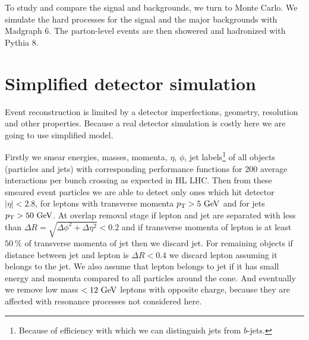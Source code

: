 \documentclass[tightenline,notitlepage,nofootinbib]{revtex4-1}
\begin{document}
To study and compare the signal and backgrounds, we turn to Monte Carlo. We simulate the hard processes for the signal and the major backgrounds with Madgraph 6. The parton-level events are then showered and hadronized with Pythia 8. 

\section{Simplified detector simulation}

Event reconstruction is limited by a detector imperfections, geometry, resolution and other properties. Because a real detector simulation is costly here we are going to use simplified model.

Firstly we smear energies, masses, momenta, $\eta$, $\phi$, jet labels\footnote{Because of efficiency with which we can distinguish jets from $b$-jets.} of all objects (particles and jets) with corresponding performance functions for $200$ average interactions per bunch crossing as expected in HL LHC. Then from these smeared event particles we are able to detect only ones which hit detector $|\eta|<2.8$, for leptons with transverse momenta $p_{\rm{T}} > 5~\rm{GeV} $ and for jets $p_{\rm T}>50~\rm{GeV}$. At overlap removal stage if lepton and jet are separated with less than $\Delta R = \sqrt{\Delta \phi^2 + \Delta \eta^2}<0.2$ and if transverse momenta of lepton is at least $50~ \%$ of transverse momenta of jet then we discard jet. For remaining objects if distance between jet and lepton is $\Delta R < 0.4$ we discard lepton assuming it belongs to the jet. We also assume that lepton belongs to jet if it has small energy and momenta compared to all particles around the cone. And eventually we remove low mass $<12 ~\rm{GeV}$ leptons with opposite charge, because they are affected with resonance processes not considered here.  
\end{document}
